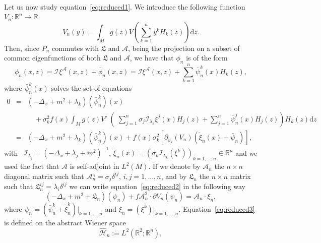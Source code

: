 \documentclass[a4paper,10pt]{article}
\newcommand{\assign}{:=}
\newcommand{\mathd}{\mathrm{d}}
\newcommand{\nobracket}{}
\begin{document}
\

Let us now study equation~{\eqref{eq:reduced1}}. We introduce the following
function $V_n : \mathbb{R}^n \rightarrow \mathbb{R}$
\[ V_n (y) = \int_M g (z) V \left( \sum_{k = 1}^n y^k H_k (z) \right) \mathd
   z. \]
Then, since $P_n$ commutes with $\mathfrak{L}$ and $\mathcal{A}$, being the
projection on a subset of common eigenfunctions of both $\mathfrak{L}$ and
$\mathcal{A}$, we have that $\phi_n$ is of the form
\[ \phi_n (x, z) = \mathcal{I}_{\mathfrak{}} \xi^{\mathcal{A}} (x, z) +
   \bar{\phi}_n (x, z) = \mathcal{I} \xi^{\mathcal{A}} (x, z) + \sum_{k = 1}^n
   \bar{\psi}_n^k (x) H_k (z), \]
where $\bar{\psi}^k_n (x)$ solves the set of equations
\begin{equation}
  \begin{array}{lll}
    0 & = & (- \Delta_x + m^2 + \lambda_k) (\bar{\psi}^k_n) (x)\\
    &  & \quad + \sigma_k^2 f (x) \int_M g (z) \left. V' \middle( \sum_{j =
    1}^n \sigma_j \mathcal{I}_{\lambda_k} \xi^j (x) H_j (z) + \left. \sum_{j =
    1}^n \bar{\psi}^j_n (x) \mathcal{} H_j (z) \right) H_k (z) \mathd z
    \right.\\
    & = & (- \Delta_x + m^2 + \lambda_k) (\bar{\psi}^k_n) (x) + f (x)
    \sigma_k^2 [\partial_{y_k} (V_n) (\tilde{\xi}_n (x) + \bar{\psi}_n)],
  \end{array} \label{eq:reduced2}
\end{equation}
with \ $\mathcal{I}_{\lambda_j} = (- \Delta_x + \lambda_j + m^2)^{- 1}$,
$\tilde{\xi}_n (x) = (\sigma_k \mathcal{I}_{\lambda_k} (\xi^k))_{k = 1,
\ldots, n} \in \mathbb{R}^n$ and we used the fact that $\mathcal{A}$ is
self-adjoint in $L^2 (M)$. If we denote by $\mathcal{A}_n$ the $n \times n$
diagonal matrix such that $\mathcal{A}^{_{i j}}_n = \sigma_j \delta^{i j}$,
$i, j = 1, \ldots, n$, and by $\mathfrak{L}_n$ the $n \times n$ matrix such
that $\mathfrak{L}_n^{i j} = \lambda_i \delta^{i j}$ we can write
equation~{\eqref{eq:reduced2}} in the following way
\begin{equation}
  (- \Delta_x + m^2 + \mathfrak{L}_n) (\psi_n) + f \mathcal{A}^2_n \cdot
  \partial V_n (\psi_n) = \mathcal{A}_n \cdot \xi_n, \label{eq:reduced3}
\end{equation}
where $\nobracket \psi_n = (\bar{\psi}_n^k + \tilde{\xi}_n^k) |_{k = 1,
\ldots, n} \nobracket$ and $\nobracket \xi_n = (\xi^k) |_{k = 1, \ldots, n}
\nobracket$. Equation~{\eqref{eq:reduced3}} is defined on the abstract Wiener
space
\[ \widehat{\mathcal{H}}_n \assign L^2 (\mathbb{R}^2 ; \mathbb{R}^n), \]
\end{document}

